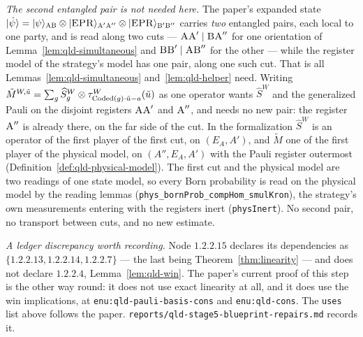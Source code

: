 \emph{The second entangled pair is not needed here.} The paper's expanded state
$|\hat\psi\rangle = |\psi\rangle_{\textsc{A}\textsc{B}} \otimes |\textsc{EPR}\rangle_{\textsc{A}'\textsc{A}''} \otimes
|\textsc{EPR}\rangle_{\textsc{B}'\textsc{B}''}$ carries \emph{two} entangled pairs, each local to one party, and is read
along two cuts --- $\textsc{A}\textsc{A}' \mid \textsc{B}\textsc{A}''$ for one orientation of
Lemma~\ref{lem:qld-simultaneous} and $\textsc{B}\textsc{B}' \mid \textsc{A}\textsc{B}''$ for the other --- while the
register model of the strategy's model has one pair, along one such cut. That is all
Lemmas~\ref{lem:qld-simultaneous} and~\ref{lem:qld-helper} need. Writing
$\tilde{M}^{W,\tilde{u}} = \sum_g \widehat S^W_g \otimes \tau^W_{\mathrm{Coded}(g) \cdot \tilde{u} -
a}(\tilde{u})$ as one operator wants $\widehat S^W$ and the generalized Pauli on the disjoint
registers $\textsc{A}\textsc{A}'$ and $\textsc{A}''$, and needs no new pair: the register $\textsc{A}''$ is
already there, on the far side of the cut. In the formalization $\widehat S^W$ is an operator of
the first player of the first cut, on $(E_A, A')$, and $\tilde{M}$ one of the first player of the
physical model, on $(A'', E_A, A')$ with the Pauli register outermost
(Definition~\ref{def:qld-physical-model}). The first cut and the physical model are two readings
of one state model, so every Born probability is read on the physical model by the reading lemmas
(\texttt{phys\_bornProb\_compHom\_smulKron}), the strategy's own measurements entering with the
registers inert (\texttt{physInert}). No second pair, no transport between cuts, and no new
estimate.

\emph{A ledger discrepancy worth recording.} Node $1.2.2.15$ declares its dependencies as
$\{1.2.2.13, 1.2.2.14, 1.2.2.7\}$ --- the last being Theorem~\ref{thm:linearity} --- and does not
declare $1.2.2.4$, Lemma~\ref{lem:qld-win}. The paper's current proof of this step is the other way
round: it does not use exact linearity at all, and it does use the win implications, at
\texttt{enu:qld-pauli-basis-cons} and \texttt{enu:qld-cons}. The \texttt{uses} list
above follows the paper. \texttt{reports/qld-stage5-blueprint-repairs.md} records it.

\effortHard

